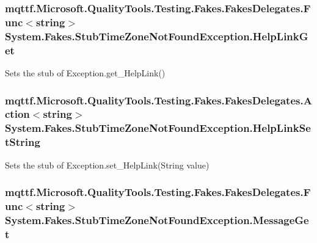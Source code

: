 \hypertarget{class_system_1_1_fakes_1_1_stub_time_zone_not_found_exception_ac83d78fddc7552c0ceff913170af9e5d}{
\subsubsection[{Help\-Link\-Get}]{\setlength{\rightskip}{0pt plus 5cm}mqttf.\-Microsoft.\-Quality\-Tools.\-Testing.\-Fakes.\-Fakes\-Delegates.\-Func$<$string$>$ System.\-Fakes.\-Stub\-Time\-Zone\-Not\-Found\-Exception.\-Help\-Link\-Get}}\label{class_system_1_1_fakes_1_1_stub_time_zone_not_found_exception_ac83d78fddc7552c0ceff913170af9e5d}


Sets the stub of Exception.\-get\-\_\-\-Help\-Link()

\hypertarget{class_system_1_1_fakes_1_1_stub_time_zone_not_found_exception_a5d7810ab0afb5c80ef136bc4ac3bf0e9}{
\subsubsection[{Help\-Link\-Set\-String}]{\setlength{\rightskip}{0pt plus 5cm}mqttf.\-Microsoft.\-Quality\-Tools.\-Testing.\-Fakes.\-Fakes\-Delegates.\-Action$<$string$>$ System.\-Fakes.\-Stub\-Time\-Zone\-Not\-Found\-Exception.\-Help\-Link\-Set\-String}}\label{class_system_1_1_fakes_1_1_stub_time_zone_not_found_exception_a5d7810ab0afb5c80ef136bc4ac3bf0e9}


Sets the stub of Exception.\-set\-\_\-\-Help\-Link(\-String value)

\hypertarget{class_system_1_1_fakes_1_1_stub_time_zone_not_found_exception_a4d4e97b50a60ddde31d1390eab3d7804}{
\subsubsection[{Message\-Get}]{\setlength{\rightskip}{0pt plus 5cm}mqttf.\-Microsoft.\-Quality\-Tools.\-Testing.\-Fakes.\-Fakes\-Delegates.\-Func$<$string$>$ System.\-Fakes.\-Stub\-Time\-Zone\-Not\-Found\-Exception.\-Message\-Get}}\label{class_system_1_1_fakes_1_1_stub_time_zone_not_found_exception_a4d4e97b50a60ddde31d1390eab3d7804}



